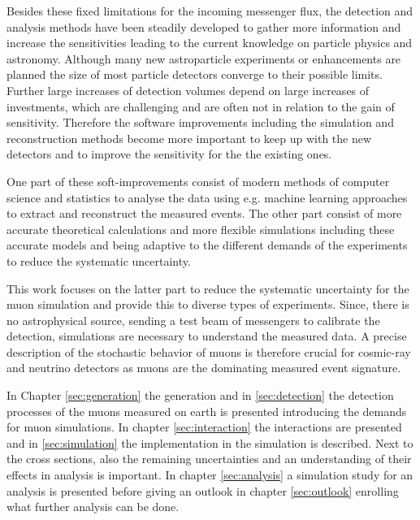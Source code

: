 Besides these fixed limitations for the incoming messenger flux, the detection and analysis methods have been steadily developed to gather more information and increase the sensitivities leading to the current knowledge on particle physics and astronomy.
Although many new astroparticle experiments or enhancements are planned the size of most particle detectors converge to their possible limits.
Further large increases of detection volumes depend on large increases of investments, which are challenging and are often not in relation to the gain of sensitivity.
Therefore the software improvements including the simulation and reconstruction methods become more important to keep up with the new detectors and to improve the sensitivity for the the existing ones.

One part of these soft-improvements consist of modern methods of computer science and statistics to analyse the data using e.g. machine learning approaches to extract and reconstruct the measured events.
The other part consist of more accurate theoretical calculations and more flexible simulations including these accurate models and being adaptive to the different demands of the experiments to reduce the systematic uncertainty.

This work focuses on the latter part to reduce the systematic uncertainty for the muon simulation and provide this to diverse types of experiments.
Since, there is no astrophysical source, sending a test beam of messengers to calibrate the detection, simulations are necessary to understand the measured data.
A precise description of the stochastic behavior of muons is therefore crucial for cosmic-ray and neutrino detectors as muons are the dominating measured event signature.

In Chapter \ref{sec:generation} the generation and in \ref{sec:detection} the detection processes of the muons measured on earth is presented introducing the demands for muon simulations.
In chapter \ref{sec:interaction} the interactions are presented and in \ref{sec:simulation} the implementation in the simulation is described.
Next to the cross sections, also the remaining uncertainties and an understanding of their effects in analysis is important.
In chapter \ref{sec:analysis} a simulation study for an analysis is presented before giving an outlook in chapter \ref{sec:outlook} enrolling what further analysis can be done.
